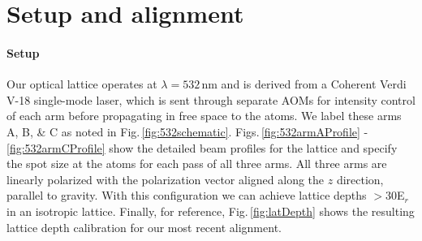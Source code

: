 
\section{Setup and alignment} \label{sssec:532_align}
\paragraph{Setup}\label{ssec:lattice_setup}
Our optical lattice operates at $\lambda=532\,$nm and is derived from a Coherent Verdi V-18 single-mode laser, which is sent through separate AOMs for intensity control of each arm before propagating in free space to the atoms. 
We label these arms A, B, \& C as noted in Fig.\,\ref{fig:532schematic}.
Figs.\,\ref{fig:532armAProfile} - \ref{fig:532armCProfile} show the detailed beam profiles for the lattice and specify the spot size at the atoms for each pass of all three arms.
All three arms are linearly polarized with the polarization vector aligned along the $z$ direction, parallel to gravity.
With this configuration we can achieve lattice depths $>30$E$_r$ in an isotropic lattice.
Finally, for reference, Fig.\,\ref{fig:latDepth} shows the resulting lattice depth calibration for our most recent alignment.


